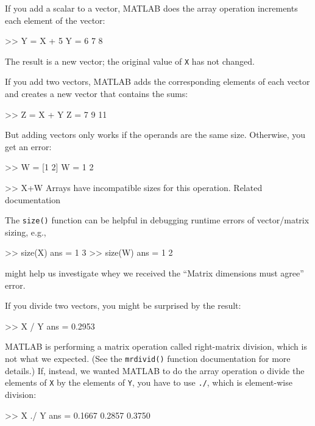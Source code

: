 \documentclass[../../book.tex]{subfiles}
\begin{document}
If you add a scalar to a vector, MATLAB does the array operation increments each element of the vector:

\begin{code}
>> Y = X + 5
Y = 6     7     8
\end{code}

The result is a new vector; the original value of \lstinline{X} has not
changed.

If you add two vectors, MATLAB adds the corresponding elements of each
vector and creates a new vector that contains the sums:

\begin{code}
>> Z = X + Y
Z = 7     9    11
\end{code}

But adding vectors only works if the operands are the same size.
Otherwise, you get an error:

\begin{code}
>> W = [1 2]
W = 1     2
\end{code}
\begin{code}
>> X+W
Arrays have incompatible sizes for this operation.
Related documentation 
\end{code}

The \lstinline{size()} function can be helpful in debugging runtime errors of vector/matrix sizing, e.g.,
\begin{code}
    >> size(X)
    ans =
         1     3
    >> size(W)
    ans =
         1     2
\end{code}
might help us investigate whey we received the ``Matrix dimensions must agree'' error.


If you divide two vectors, you might be surprised by the result:

\begin{code}
>> X / Y
ans = 0.2953
\end{code}

MATLAB is performing a matrix operation called right-matrix division, which is not what we expected.  (See the \lstinline{mrdivid()} function documentation for more details.)
If, instead, we wanted MATLAB to do the array operation o divide the elements of \lstinline{X} by the elements of \lstinline{Y}, you have to use \lstinline{./}, which is element-wise division:

\begin{code}
>> X ./ Y
ans = 0.1667    0.2857    0.3750
\end{code}
\end{document}
